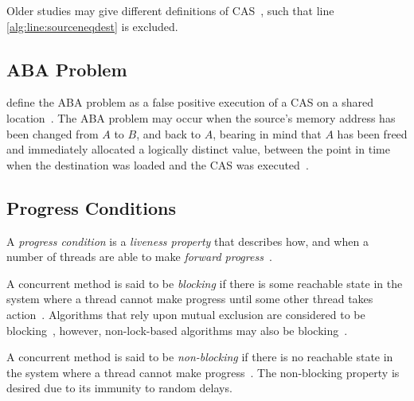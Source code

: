 Older studies may give different definitions of
CAS~\citetext{\citealp{scott2013shared},~Table~2.2;~\citealp{valois1995datastructures},
Appendix~A}, such that line \ref{alg:line:sourceneqdest} is excluded.

\subsection{ABA Problem}
\citeauthor{dechev2010understanding} define the ABA problem as a false positive
execution of a CAS on a shared location~\citep{dechev2010understanding}. The ABA
problem may occur when the source's memory address has been changed from $A$ to
$B$, and back to $A$, bearing in mind that $A$ has been freed and immediately
allocated a logically distinct value, between the point in time when the
destination was loaded and the CAS was executed~\citep{dechev2010understanding}.


\subsection{Progress Conditions}
A \emph{progress condition} is a \emph{liveness property} that describes how,
and when a number of threads are able to make \emph{forward
progress}~\citep[Section~3.2]{scott2013shared}.

A concurrent method is said to be \emph{blocking} if there is some reachable
state in the system where a thread cannot make progress until some other thread
takes action~\citep[Section~3.2]{scott2013shared}. Algorithms that rely upon
mutual exclusion are considered to be
blocking~\citep[Section~3.2]{scott2013shared}, however, non-lock-based
algorithms may also be blocking~\citep{mellor1987concurrent}.

A concurrent method is said to be \emph{non-blocking} if there is no reachable
state in the system where a thread cannot make
progress~\cite[Section~3.2]{scott2013shared}. The non-blocking property is
desired due to its immunity to random delays. %

